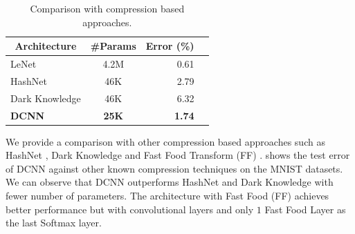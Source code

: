 

\begin{table}
  \centering
    \begin{tabular}{lcrc}
    \toprule
    \multicolumn{1}{c}{\textbf{Architecture}} & \multicolumn{1}{c}{\textbf{\#Params}} & \textbf{Error (\%)} \\
    \midrule
    LeNet \cite{lecun1998gradient}             & 4.2M         & 0.61          \\
    HashNet \cite{chen2015compressing}         & 46K          & 2.79          \\
    Dark Knowledge \cite{hinton2015distilling} & 46K          & 6.32          \\
    \textbf{DCNN}                              & \textbf{25K} & \textbf{1.74} \\
    \bottomrule
    \end{tabular}%
    \caption{Comparison with compression based approaches.}
  \label{table:ch4-mnist}%
\end{table}%



We provide a comparison with other compression based approaches such as HashNet \cite{chen2015compressing}, Dark Knowledge \cite{hinton2015distilling} and Fast Food Transform (FF) \cite{yang2015deep}. 
 shows the test error of DCNN against other known compression techniques on the MNIST datasets.
We can observe that DCNN outperforms HashNet \cite{chen2015compressing} and Dark Knowledge \cite{hinton2015distilling} with fewer number of parameters.
The architecture with Fast Food (FF) \cite{yang2015deep} achieves better performance but with convolutional layers and only $1$ Fast Food Layer as the last Softmax layer. 

